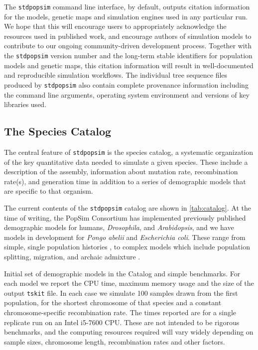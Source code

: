 \documentclass[12pt,halfline,a4paper]{ouparticle}
\newcommand{\stdpopsim}{\texttt{stdpopsim}\xspace}
\newcommand{\tskit}{\texttt{tskit}\xspace}
\begin{document}
The \stdpopsim command line interface, by default, outputs citation information
for the models, genetic maps and simulation engines used in any particular run.
We hope that this will encourage users to appropriately acknowledge the
resources used in published work, and encourage authors
of simulation models to contribute to our ongoing community-driven development process.
Together with the \stdpopsim version number and the long-term stable identifiers
for population models and genetic maps,
this citation information will result in well-documented and reproducible
simulation workflows. The individual tree sequence files produced by
\stdpopsim also contain complete provenance information including the command
line arguments, operating system environment and versions of key libraries
used.

\subsection*{The Species Catalog}
The central feature of \stdpopsim is the species catalog, a systematic organization
of the key quantitative data needed to simulate a given species. These include a description
of the assembly, information about mutation rate, recombination rate(s), and generation time
in addition to a series of demographic models that are specific to that organism. 

The current contents of the \stdpopsim catalog are shown in \autoref{tab:catalog}. At the time of
writing, the PopSim Consortium has implemented previously published demographic models for
humans, \emph{Drosophila}, and \emph{Arabidopsis}, 
and we have models in development for \emph{Pongo abelii} and \emph{Escherichia coli}.
These range from
simple, single population histories \cite[e.g.,][]{sheehan2016deep},
to complex models which include population splitting, migration, and archaic
admixture \cite[e.g.,][]{ragsdale2019models}.

\renewcommand{\arraystretch}{1.2}
\begin{table}[t]
\makebox[\textwidth][c]{
    \begin{footnotesize}
    
    \end{footnotesize}
}
\caption{\label{tab:catalog}
Initial set of demographic models in the Catalog and simple benchmarks.
For each model we report the CPU time, maximum memory usage and the
size of the output \tskit file. In each case we simulate 100 samples
drawn from the first population, for the shortest chromosome of that species
and a constant chromosome-specific recombination rate.
The times reported are for a single replicate run on an Intel i5-7600 CPU.
These are not intended to be rigorous benchmarks, and the computing resources
required will vary widely depending on sample sizes, chromosome length,
recombination rates and other factors.
}
\end{table}
\end{document}
